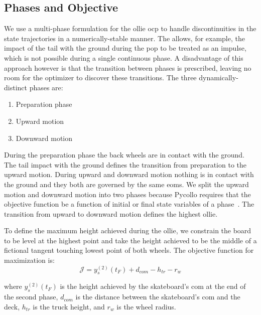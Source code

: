 \documentclass[default,iicol]{sn-jnl}
\begin{document}
\subsection{Phases and Objective} \label{s_phases}

We use a multi-phase formulation for the ollie \gls{ocp} to handle discontinuities in the state trajectories in a numerically-stable manner. The allows, for example, the impact of the tail with the ground during the pop to be treated as an impulse, which is not possible during a single continuous phase. A disadvantage of this approach however is that the transition between phases is prescribed, leaving no room for the optimizer to discover these transitions. The three dynamically-distinct phases are:
\begin{enumerate} \label{n_phases}
  \item Preparation phase
  \item Upward motion
  \item Downward motion
\end{enumerate}

During the preparation phase the back wheels are in contact with the ground. The tail impact with the ground defines the transition from preparation to the upward motion. During upward and downward motion nothing is in contact with the ground and they both are governed by the same \glspl{eom}. We split the upward motion and downward motion into two phases because Pycollo requires that the objective function be a function of initial or final state variables of a phase~\cite{brockie_2021_predictive}. The transition from upward to downward motion defines the highest ollie.

To  define the maximum height achieved during the ollie, we constrain the board to be level at the highest point and
take the height achieved to be the middle of a fictional tangent touching lowest point of both wheels. The objective function for maximization is:
%
\begin{equation}
  \mathcal{J} = y_s^{(2)}(t_F) + d_{com} - h_{tr} - r_w
\end{equation}

\noindent where $y_s^{(2)}(t_F)$ is the height achieved by the skateboard's \gls{com} at the end of the second phase, $d_{com}$ is the distance between the skateboard's \gls{com} and the deck, $h_{tr}$ is the truck height, and $r_w$ is the wheel radius.
\end{document}
